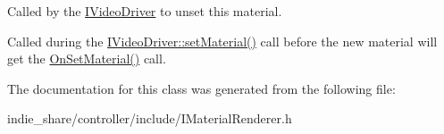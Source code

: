 Called by the \hyperlink{classirr_1_1video_1_1IVideoDriver}{I\+Video\+Driver} to unset this material. 

Called during the \hyperlink{classirr_1_1video_1_1IVideoDriver_a8c9e31b41b7e6fd26cf65ce538ebab05}{I\+Video\+Driver\+::set\+Material()} call before the new material will get the \hyperlink{classirr_1_1video_1_1IMaterialRenderer_aeaffc03c1b9feb40cd01469726b287e3}{On\+Set\+Material()} call. 

The documentation for this class was generated from the following file\+:\begin{DoxyCompactItemize}
\item 
indie\+\_\+share/controller/include/I\+Material\+Renderer.\+h\end{DoxyCompactItemize}
